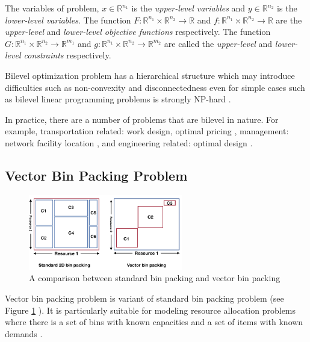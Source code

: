 The variables of problem, $x \in \mathbb{R}^{n_1}$ is the \emph{upper-level variables} and $y \in \mathbb{R}^{n_2}$ is the \emph{lower-level variables}. The function $F : \mathbb{R}^{n_1} \times  \mathbb{R}^{n_2} \to \mathbb{R}$ and $f : \mathbb{R}^{n_1} \times  \mathbb{R}^{n_2} \to \mathbb{R}$ are the \emph{upper-level} and \emph{lower-level objective functions} respectively. The function $G : \mathbb{R}^{n_1} \times  \mathbb{R}^{n_2} \to \mathbb{R}^{m_1}$ and $g : \mathbb{R}^{n_1} \times  \mathbb{R}^{n_2} \to \mathbb{R}^{m_2}$ are called the \emph{upper-level} and \emph{lower-level constraints} respectively. 

Bilevel optimization problem has a hierarchical structure which may introduce difficulties such as non-convexity and disconnectedness even for simple cases such as bilevel linear programming problems is strongly NP-hard \cite{:2013tn}. 

In practice, there are a number of problems that are bilevel in nature. For example, transportation related: work design, optimal pricing \cite{Brotcorne:2001je, Constantin:1995up}, management: network facility location \cite{Sun:2008ta},  and engineering related: optimal design \cite{KirjnerNeto:1998tp}. 

\subsection{Vector Bin Packing Problem}

\begin{figure}
	\centering
	\includegraphics[width=0.6\textwidth]{pics/bin_packing_problem.png}
	\caption{A comparison between standard bin packing and vector bin packing}
	\label{fig:bin_packing_problem}
\end{figure}

Vector bin packing problem is variant of standard bin packing problem (see Figure \ref{fig:bin_packing_problem} ).  It is particularly suitable for modeling resource allocation problems where there is a set of bins with known capacities and a set of items with known demands \cite{Panigrahy:2011wk}. 

